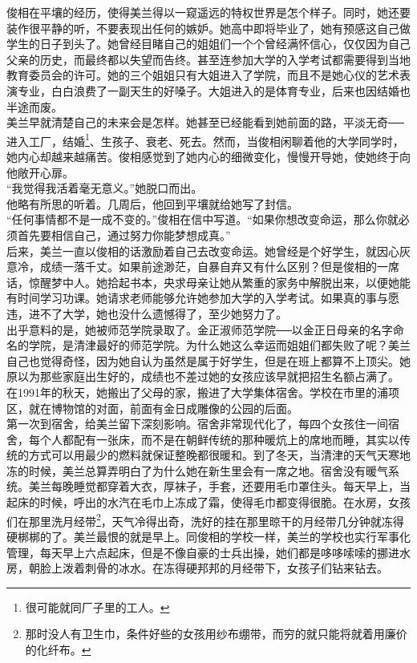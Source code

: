 俊相在平壤的经历，使得美兰得以一窥遥远的特权世界是怎个样子。同时，她还要装作很平静的听，不要表现出任何的嫉妒。她高中即将毕业了，她有预感这自己做学生的日子到头了。她曾经目睹自己的姐姐们一个个曾经满怀信心，仅仅因为自己父亲的历史，而最终都以失望而告终。甚至连参加大学的入学考试都需要得到当地教育委员会的许可。她的三个姐姐只有大姐进入了学院，而且不是她心仪的艺术表演专业，白白浪费了一副天生的好嗓子。大姐进入的是体育专业，后来也因结婚也半途而废。\\

美兰早就清楚自己的未来会是怎样。她甚至已经能看到她前面的路，平淡无奇──进入工厂，结婚\footnote{很可能就同厂子里的工人。}、生孩子、衰老、死去。然而，当俊相闲聊着他的大学同学时，她内心却越来越痛苦。俊相感觉到了她内心的细微变化，慢慢开导她，使她终于向他敞开心扉。\\

“我觉得我活着毫无意义。”她脱口而出。\\

他略有所思的听着。几周后，他回到平壤就给她写了封信。\\

“任何事情都不是一成不变的。”俊相在信中写道。“如果你想改变命运，那么你就必须首先要相信自己，通过努力你能梦想成真。”\\

后来，美兰一直以俊相的话激励着自己去改变命运。她曾经是个好学生，就因心灰意冷，成绩一落千丈。如果前途渺茫，自暴自弃又有什么区别？但是俊相的一席话，惊醒梦中人。她拾起书本，央求母亲让她从繁重的家务中解脱出来，以便她能有时间学习功课。她请求老师能够允许她参加大学的入学考试。如果真的事与愿违，进不了大学，她也没什么遗憾得了，至少她努力了。\\

出乎意料的是，她被师范学院录取了。金正淑师范学院──以金正日母亲的名字命名的学院，是清津最好的师范学院。为什么她这么幸运而姐姐们都失败了呢？美兰自己也觉得奇怪，因为她自认为虽然是属于好学生，但是在班上都算不上顶尖。她原以为那些家庭出生好的，成绩也不差过她的女孩应该早就把招生名额占满了。\\

在1991年的秋天，她搬出了父母的家，搬进了大学集体宿舍。学校在市里的浦项区，就在博物馆的对面，前面有金日成雕像的公园的后面。\\

第一次到宿舍，给美兰留下深刻影响。宿舍非常现代化了，每四个女孩住一间宿舍，每个人都配有一张床，而不是在朝鲜传统的那种暖炕上的席地而睡，其实以传统的方式可以用最少的燃料就保证整晚都很暖和。到了冬天，当清津的天气天寒地冻的时候，美兰总算弄明白了为什么她在新生里会有一席之地。宿舍没有暖气系统。美兰每晚睡觉都穿着大衣，厚袜子，手套，还要用毛巾罩住头。每天早上，当起床的时候，呼出的水汽在毛巾上冻成了霜，使得毛巾都变得很脆。在水房，女孩们在那里洗月经带\footnote{那时没人有卫生巾，条件好些的女孩用纱布绷带，而穷的就只能将就着用廉价的化纤布。}，天气冷得出奇，洗好的挂在那里晾干的月经带几分钟就冻得硬梆梆的了。美兰最恨的就是早上。同俊相的学校一样，美兰的学校也实行军事化管理，每天早上六点起床，但是不像自豪的士兵出操，她们都是哆哆嗦嗦的挪进水房，朝脸上泼着刺骨的冰水。在冻得硬邦邦的月经带下，女孩子们钻来钻去。\\

